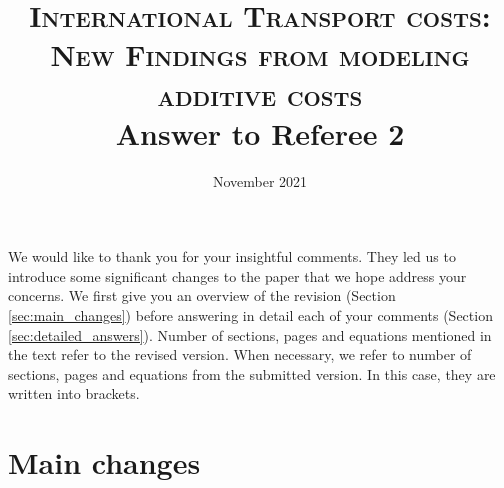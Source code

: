 \documentclass[a4paper,11pt]{article}
\begin{document}
\title{\textsc{International Transport costs:\\New Findings from modeling additive costs} \\
Answer to Referee 2}



\date{November 2021}
 \maketitle
\bigskip

We would like to thank you for your insightful comments. They led us to introduce some
significant changes to the paper that we hope address your concerns. We first give you an overview
of the revision (Section \ref{sec:main_changes}) before answering in detail each of your comments (Section \ref{sec:detailed_answers}). Number of sections, pages and equations mentioned in the text refer to the revised version. When necessary, we refer to number of sections, pages and equations from the submitted version. In this case, they are written into brackets.

\section{Main changes \label{sec:main_changes}}
\end{document}
